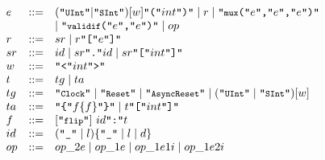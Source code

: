 {\begin{figure}[htbp]
{\[\begin{array}{l l l}
%
%
  e & ::= & (\mbox{\tt ``\fnprettyll{UInt}''} | \mbox{\tt ``\fnprettyll{SInt}''}) [w] \mbox{\tt ``(''}int\mbox{\tt ``)''} \mid r \mid \mbox{\tt ``\fnprettyll{mux}(''}e\mbox{\tt ``,''} e\mbox{\tt ``,''} e\mbox{\tt ``)''} \\
    &     &
 \mid \mbox{\tt ``\fnprettyll{validif}(''}e\mbox{\tt ``,''} e\mbox{\tt ``)''}
        \mid op\\
%
r & ::= & sr \mid r \mbox{\tt ``[''} e \mbox{\tt ``]''}\\
%
sr & ::= & id \mid sr\mbox{\tt ``.''}id \mid sr\mbox{\tt ``[''}int\mbox{\tt ``]''}\\
w & ::= & \mbox{\tt ``<''} int \mbox{\tt ``>''}\\
%
%
%
t & ::= & tg \mid ta \\
 tg & ::= &  \mbox{\tt ``\fnprettyll{Clock}''} \mid \mbox{\tt ``\fnprettyll{Reset}''} \mid \mbox{\tt ``\fnprettyll{AsyncReset}''} \mid (\mbox{\tt ``\fnprettyll{UInt}''} \mid \mbox{\tt ``\fnprettyll{SInt}''}) [w] \\
%
  ta & ::= &\mbox{\tt ``\{''} f \{f\}\mbox{\tt ``\}''} \mid t \mbox{\tt ``[''} int \mbox{\tt ``]''} \\
%
    f & ::= & [\mbox{\tt ``\fnprettyll{flip}''}]\ id\mbox{\tt ``:''}t\\
%
id & ::= & ( \mbox{\tt ``\_''} \mid l) \{ \mbox{\tt ``\_''} \mid l \mid d\} \\
op & ::= & op\_2e \mid op\_1e \mid op\_1e1i \mid op\_1e2i \\

\end{array}\]}
\end{figure}}
